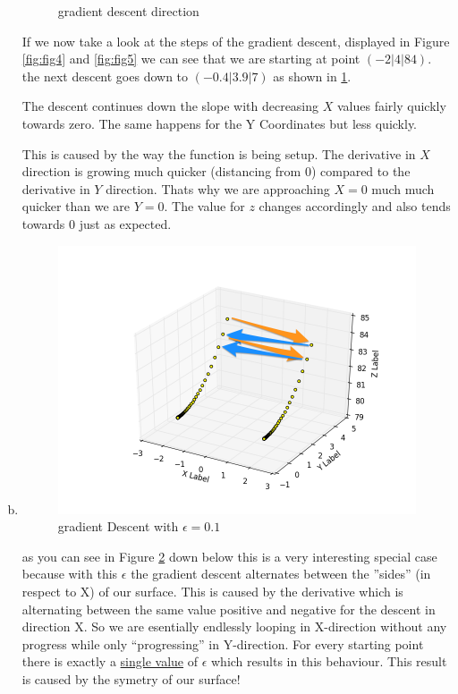 \documentclass[12pt]{article}
\begin{document}
\begin{enumerate}[a)]
\begin{figure}[H]
            \caption{gradient descent direction}
            \label{fig:fig6}
        \end{figure}
        If we now take a look at the steps of the gradient descent, displayed in Figure \ref{fig:fig4} and \ref{fig:fig5} we can see that we are starting at point $(-2 \vert 4 \vert 84)$. the next descent goes down to $(-0.4 \vert 3.9 \vert 7)$ as shown in \ref{fig:fig6}. 
        
        The descent continues down the slope with decreasing $X$ values fairly quickly towards zero. The same happens for the Y Coordinates but less quickly. 
        
        This is caused by the way the function is being setup. The derivative in $X$ direction is growing much quicker (distancing from $0$) compared to the derivative in $Y$ direction. Thats why we are approaching $X = 0$ much much quicker than we are $Y = 0$. The value for $z$ changes accordingly and also tends towards $0$ just as expected. 
    \item
        \begin{figure}[H]
            \centering
            \includegraphics[width=300pt]{pictures/figure_1.png}
            \caption{gradient Descent with $\epsilon = 0.1$}
            \label{fig:fig1}
        \end{figure}
        as you can see in Figure \ref{fig:fig1} down below this is a very interesting special case because with this $\epsilon$ the gradient descent alternates between the ''sides'' (in respect to X) of our surface. This is caused by the derivative which is alternating between the same value positive and negative for the descent in direction X. So we are esentially endlessly looping in X-direction without any progress while only ``progressing'' in Y-direction. For every starting point there is exactly a \underline{single value} of $\epsilon$ which results in this behaviour. This result is caused by the symetry of our surface!
\end{enumerate}
\end{document}

